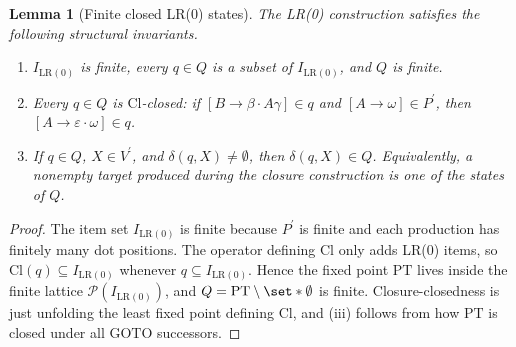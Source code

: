 \documentclass[11pt,a4paper]{article}
\theoremstyle{prettyplain}
\newtheorem{lemma}[theorem]{Lemma}
\theoremstyle{prettydef}
\newcommand{\Pow}{\ensuremath{\mathcal P}}
\newcommand{\eps}{\varepsilon}
\newcommand{\LRzero}{\mathrm{LR(0)}}
\newcommand{\Item}[2]{[#1\to #2]}
\begin{document}
\begin{lemma}[Finite closed LR(0) states]\label{lem:state-finiteness}
The LR(0) construction satisfies the following structural invariants.
\begin{enumerate}[label=\textup{(\roman*)}]
\item \(I_{\LRzero}\) is finite, every \(q\in Q\) is a subset of
      \(I_{\LRzero}\), and \(Q\) is finite.
\item Every \(q\in Q\) is \(\mathrm{Cl}\)-closed: if
      \(\Item{B}{\beta\cdot A\gamma}\in q\) and
      \(\Item{A}{\omega}\in P^\prime\), then
      \(\Item{A}{\eps\cdot\omega}\in q\).
\item If \(q\in Q\), \(X\in V^\prime\), and \(\delta(q,X)\ne\emptyset\), then
      \(\delta(q,X)\in Q\).  Equivalently, a nonempty target produced during the
      closure construction is one of the states of \(Q\).
\end{enumerate}
\end{lemma}

\begin{proof}
The item set \(I_{\LRzero}\) is finite because \(P^\prime\) is finite and each
production has finitely many dot positions.  The operator defining
\(\mathrm{Cl}\) only adds LR(0) items, so \(\mathrm{Cl}(q)\subseteq I_{\LRzero}\)
whenever \(q\subseteq I_{\LRzero}\).  Hence the fixed point \(\mathrm{PT}\) lives
inside the finite lattice \(\Pow(I_{\LRzero})\), and
\(Q=\mathrm{PT}\setminus\set*{\emptyset}\) is finite.  Closure-closedness is just
unfolding the least fixed point defining \(\mathrm{Cl}\), and (iii) follows from
how \(\mathrm{PT}\) is closed under all \(\mathrm{GOTO}\) successors.
\end{proof}
\end{document}
